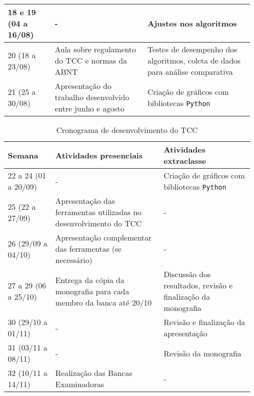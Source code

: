 \begin{table}[htb]
\begin{tabular}{|p{4cm}|p{5cm}|p{5cm}|}
        \hline
        18 e 19 (04 a 16/08) & - & Ajustes nos algoritmos \\
        \hline
        20 (18 a 23/08) & Aula sobre regulamento do TCC e normas da ABNT & Testes de desempenho dos algoritmos, coleta de dados para análise comparativa\\
        \hline
        21 (25 a 30/08) & Apresentação do trabalho desenvolvido entre junho e agosto & Criação de gráficos com bibliotecas \texttt{Python} \\
        \hline
    \end{tabular}
    \label{tab:cronograma}
\end{table}

\begin{table}[htb]
    \centering
    \renewcommand{\arraystretch}{1.3}
    \begin{tabular}{|p{4cm}|p{5cm}|p{5cm}|}
	\hline
        \textbf{Semana} & \textbf{Atividades presenciais} & \textbf{Atividades extraclasse} \\
        \hline
        22 a 24 (01 a 20/09) & - & Criação de gráficos com bibliotecas \texttt{Python} \\
        \hline
        25 (22 a 27/09) & Apresentação das ferramentas utilizadas no desenvolvimento do TCC & - \\
        \hline
        26 (29/09 a 04/10) & Apresentação complementar das ferramentas (se necessário) & - \\
        \hline
        27 a 29 (06 a 25/10) & Entrega da cópia da monografia para cada membro da banca até 20/10 & Discussão dos resultados, revisão e finalização da monografia \\
        \hline
        30 (29/10 a 01/11) & - & Revisão e finalização da apresentação \\
        \hline
        31 (03/11 a 08/11) & - & Revisão da monografia \\
        \hline
        32 (10/11 a 14/11) & Realização das Bancas Examinadoras & - \\
        \hline
    \end{tabular}
    \caption{Cronograma de desenvolvimento do TCC}
\end{table}
